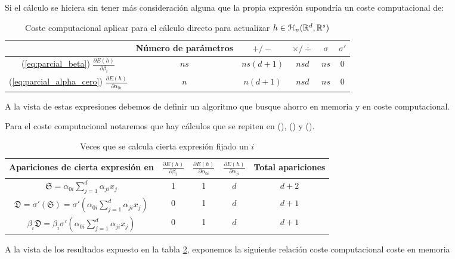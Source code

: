 Si el cálculo se hiciera sin tener más consideración alguna que la propia expresión supondría un coste computacional de: 



\begin{table}[h]
    \begin{center}
    \begin{tabular}{| c | c | c | c | c | c| }
    \hline
       & Número de parámetros & $+ / -$ & $\times / \div$ & $\sigma$ & $\sigma'$
    \\ \hline
    (\ref{eq:parcial_beta}) $\frac{\partial E(h)}{\partial \beta_i}$ 
    & $n s$ & $n s (d+1)$ & $n s d$ & $n s$ & 0
    \\
    \hline
    (\ref{eq:parcial_alpha_cero}) $\frac{\partial E(h)}{\partial \alpha_{0 i}}$ 
    & $n$ & $n (d+1)$ & $n s d$ & $n s$ & 0
    \\
    \hline
    \end{tabular}
    \caption{Coste computacional aplicar para el cálculo directo para actualizar $h \in \mathcal{H}_n(\mathbb{R}^d, \mathbb{R}^s)$}
    \label{tab:coste-computacional-directa}
    \end{center}
\end{table}

A la vista de estas expresiones debemos de definir un algoritmo que busque ahorro en memoria y en coste computacional.

Para el coste computacional notaremos que hay cálculos que se repiten en (), () y  
(). 

\begin{table}[h]
    \begin{center}
    \begin{tabular}{| c | c | c | c | c| }
    \hline
    Apariciones de cierta expresión en 
    & $\frac{\partial E(h)}{\partial \beta_i}$ 
    & $\frac{\partial E(h)}{\partial \alpha_{0 i}}$ 
    &$\frac{\partial E(h)}{\partial \alpha_{j i}}$ 
    & Total apariciones 
    \\ \hline
    $\mathfrak{S} =  \alpha_{0 i} \sum_{j=1}^d \alpha_{j i}x_j$ 
    & 1 & 1& $d$ & $d+2$
    \\
    $\mathfrak{D} = \sigma'
    \left(  
        \mathfrak{S}
    \right) = \sigma'
    \left(  
     \alpha_{0 i} 
     \sum_{j=1}^d \alpha_{j i}x_j
    \right)$
    & 0 & 1 & $d$  & $d+1$
    \\
    $\beta_i \mathfrak{D} = \beta_i \sigma'
    \left(  
     \alpha_{0 i} 
     \sum_{j=1}^d \alpha_{j i}x_j
    \right)$
    & 0 & 1 & $d$ & $d+1$
    \\ \hline
    \end{tabular}
    \caption{Veces que se calcula cierta expresión fijado un $i$}
    \label{tab:expresiones_repetidas_en_descenso_gradiente}
    \end{center}
\end{table}

A la vista de los resultados expuesto en la tabla \ref{tab:expresiones_repetidas_en_descenso_gradiente}, exponemos la siguiente relación coste computacional coste en memoria

